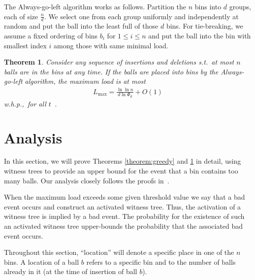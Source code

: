 \documentclass[a4paper,12pt]{article}
\newcommand\load{L_{\mathrm{max}}}
\newtheorem{theorem}{Theorem}
\begin{document}
The Always-go-left algorithm works as follows. Partition the $n$ bins into $d$ groups, each of size $\frac{n}{d}$. We select one from each group uniformly and independently at random and put the ball into the least full of those $d$ bins. For tie-breaking, we assume a fixed ordering of bins $b_i$ for $1 \leq i \leq n$ and put the ball into the bin with smallest index $i$ among those with same minimal load.

\begin{comment}
\begin{theorem}
\label{theorem:agln}
If $n$ balls are placed into $n$ bins using the Always-go-left scheme, the maximum load will be
\begin{align*}
\load \leq \frac{\ln\ln n}{d  \ln \Phi_d} + O(1)
\end{align*}
w.h.p.
\end{theorem}
\end{comment}

\begin{theorem}
\label{theorem:aglm}
Consider any sequence of insertions and deletions s.t.~at most $n$ balls are in the bins at any time. If the balls are placed into bins by the Always-go-left algorithm, the maximum load is at most 
\begin{align*}
\load = \frac{\ln\ln n}{d  \ln \Phi_d} + O(1)
\end{align*}
w.h.p.,~for all $t$~\cite{VOC03}.
\end{theorem}

\section{Analysis}
\label{sec:analysis}
In this section, we will prove Theorems \ref{theorem:greedy} and \ref{theorem:aglm} in detail, using witness trees to provide an upper bound for the event that a bin contains too many balls. Our analysis closely follows the proofs in~\cite{VOC03}.

When the maximum load exceeds some given threshold value we say that a bad event occurs and construct an activated witness tree. Thus, the activation of a witness tree is implied by a bad event. The probability for the existence of such an activated witness tree upper-bounds the probability that the associated bad event occurs.

Throughout this section, ``location'' will denote a specific place in one of the $n$ bins. A location of a ball $b$ refers to a specific bin and to the number of balls already in it (at the time of insertion of ball $b$).
\end{document}
